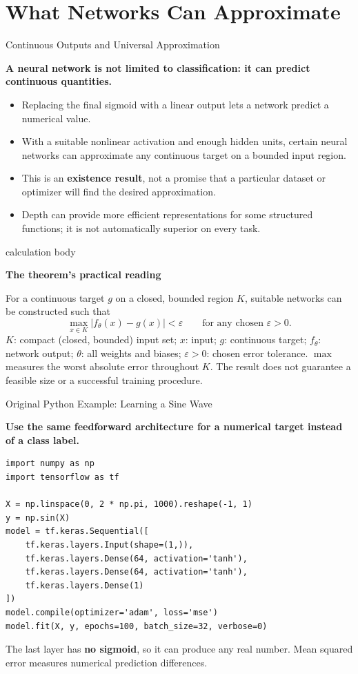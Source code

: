 \documentclass[aspectratio=169,10pt]{beamer}
\newcommand{\conceptlead}[1]{{\small\bfseries\color{CalPolyGreen}#1\par}}
\newenvironment{calculation}[1][Mathematical description]{%
 \par\begingroup\setbeamercolor{calculation body}{bg=DeckSoft,fg=DeckInk}%
 \begin{beamercolorbox}[sep=3pt,wd=\linewidth]{calculation body}%
 \footnotesize{\bfseries\color{DeckMuted}#1\par}%
 \setlength{\abovedisplayskip}{3pt}\setlength{\belowdisplayskip}{3pt}\setlength{\jot}{0pt}%
}{\end{beamercolorbox}\endgroup}
\begin{document}
\section{What Networks Can Approximate}
\begin{frame}[t]{Continuous Outputs and Universal Approximation}
\small
\conceptlead{A neural network is not limited to classification: it can predict continuous quantities.}
\begin{itemize}
 \item Replacing the final sigmoid with a linear output lets a network predict a numerical value.
 \item With a suitable nonlinear activation and enough hidden units, certain neural networks can approximate any continuous target on a bounded input region.
 \item This is an \textbf{existence result}, not a promise that a particular dataset or optimizer will find the desired approximation.
 \item Depth can provide more efficient representations for some structured functions; it is not automatically superior on every task.
\end{itemize}
\begin{calculation}[The theorem's practical reading]
For a continuous target $g$ on a closed, bounded region $K$, suitable networks can be constructed such that
\[\max_{x\in K}|f_{\theta}(x)-g(x)|<\varepsilon\qquad\text{for any chosen }\varepsilon>0.\]
$K$: compact (closed, bounded) input set; $x$: input; $g$: continuous target; $f_\theta$: network output; $\theta$: all weights and biases; $\varepsilon>0$: chosen error tolerance. $\max$ measures the worst absolute error throughout $K$. The result does not guarantee a feasible size or a successful training procedure.
\end{calculation}
\end{frame}

\begin{frame}[fragile,t]{Original Python Example: Learning a Sine Wave}
\small
\conceptlead{Use the same feedforward architecture for a numerical target instead of a class label.}
{\scriptsize\begin{verbatim}
import numpy as np
import tensorflow as tf

X = np.linspace(0, 2 * np.pi, 1000).reshape(-1, 1)
y = np.sin(X)
model = tf.keras.Sequential([
    tf.keras.layers.Input(shape=(1,)),
    tf.keras.layers.Dense(64, activation='tanh'),
    tf.keras.layers.Dense(64, activation='tanh'),
    tf.keras.layers.Dense(1)
])
model.compile(optimizer='adam', loss='mse')
model.fit(X, y, epochs=100, batch_size=32, verbose=0)
\end{verbatim}}
\begin{keyidea}The last layer has \textbf{no sigmoid}, so it can produce any real number. Mean squared error measures numerical prediction differences.\end{keyidea}
\end{frame}
\end{document}
